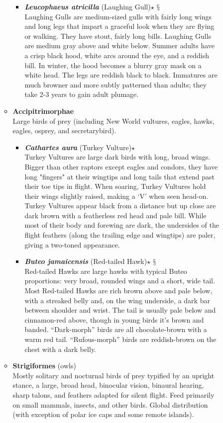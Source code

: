 \documentclass[a4paper,12pt]{article}
\begin{document}
\begin{description}
\begin{itemize}
\begin{itemize}
\begin{itemize}
      \item{\textbf{\textit{Leucophaeus atricilla}} (Laughing Gull)$\star$ $\mathsection$} \\ Laughing Gulls are medium-sized gulls with fairly long wings and long legs that impart a graceful look when they are flying or walking. They have stout, fairly long bills. Laughing Gulls are medium gray above and white below. Summer adults have a crisp black hood, white arcs around the eye, and a reddish bill. In winter, the hood becomes a blurry gray mask on a white head. The legs are reddish black to black. Immatures are much browner and more subtly patterned than adults; they take 2-3 years to gain adult plumage.
    \end{itemize} 
    \item {\textbf{Accipitrimorphae}} \\ Large birds of prey (including New World vultures, eagles, hawks, eagles, osprey, and secretarybird).
    \begin{itemize}
      \item{\textbf{\textit{Cathartes aura}} (Turkey Vulture)$\star$} \\ Turkey Vultures are large dark birds with long, broad wings. Bigger than other raptors except eagles and condors, they have long "fingers" at their wingtips and long tails that extend past their toe tips in flight. When soaring, Turkey Vultures hold their wings slightly raised, making a ‘V’ when seen head-on. Turkey Vultures appear black from a distance but up close are dark brown with a featherless red head and pale bill. While most of their body and forewing are dark, the undersides of the flight feathers (along the trailing edge and wingtips) are paler, giving a two-toned appearance.
      \item{\textbf{\textit{Buteo jamaicensis}} (Red-tailed Hawk)$\star$ $\mathsection$} \\ Red-tailed Hawks are large hawks with typical Buteo proportions: very broad, rounded wings and a short, wide tail. Most Red-tailed Hawks are rich brown above and pale below, with a streaked belly and, on the wing underside, a dark bar between shoulder and wrist. The tail is usually pale below and cinnamon-red above, though in young birds it’s brown and banded. “Dark-morph” birds are all chocolate-brown with a warm red tail. “Rufous-morph” birds are reddish-brown on the chest with a dark belly.
    \end{itemize}
    \item {\textbf{Strigiformes} (owls)} \\ Mostly solitary and nocturnal birds of prey typified by an upright stance, a large, broad head, binocular vision, binaural hearing, sharp talons, and feathers adapted for silent flight. Feed primarily on small mammals, insects, and other birds. Global distribution (with exception of polar ice caps and some remote islands).

\end{itemize}
\end{itemize}
\end{description}
\end{document}
